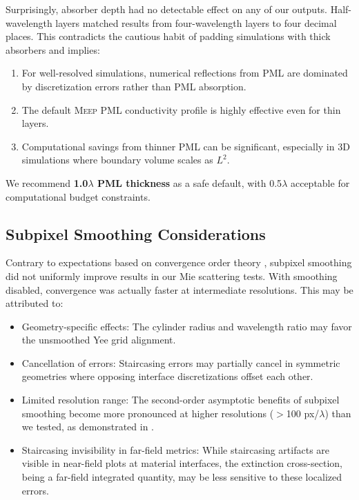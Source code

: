 \documentclass[12pt, a4paper]{article}
\newcommand{\meep}{\textsc{Meep}}
\begin{document}
Surprisingly, absorber depth had no detectable effect on any of our outputs. Half-wavelength layers matched results from four-wavelength layers to four decimal places. This contradicts the cautious habit of padding simulations with thick absorbers and implies:

\begin{enumerate}
    \item For well-resolved simulations, numerical reflections from PML are dominated by discretization errors rather than PML absorption.
    \item The default \meep{} PML conductivity profile is highly effective even for thin layers.
    \item Computational savings from thinner PML can be significant, especially in 3D simulations where boundary volume scales as $L^2$.
\end{enumerate}

We recommend \textbf{1.0$\lambda$ PML thickness} as a safe default, with 0.5$\lambda$ acceptable for computational budget constraints.

\subsection{Subpixel Smoothing Considerations}

Contrary to expectations based on convergence order theory \citep{Farjadpour2006}, subpixel smoothing did not uniformly improve results in our Mie scattering tests. With smoothing disabled, convergence was actually faster at intermediate resolutions. This may be attributed to:

\begin{itemize}
    \item Geometry-specific effects: The cylinder radius and wavelength ratio may favor the unsmoothed Yee grid alignment.
    \item Cancellation of errors: Staircasing errors may partially cancel in symmetric geometries where opposing interface discretizations offset each other.
    \item Limited resolution range: The second-order asymptotic benefits of subpixel smoothing become more pronounced at higher resolutions ($>$100 px/$\lambda$) than we tested, as demonstrated in \citet{Farjadpour2006}.
    \item Staircasing invisibility in far-field metrics: While staircasing artifacts are visible in near-field plots at material interfaces, the extinction cross-section, being a far-field integrated quantity, may be less sensitive to these localized errors.
\end{itemize}
\end{document}
